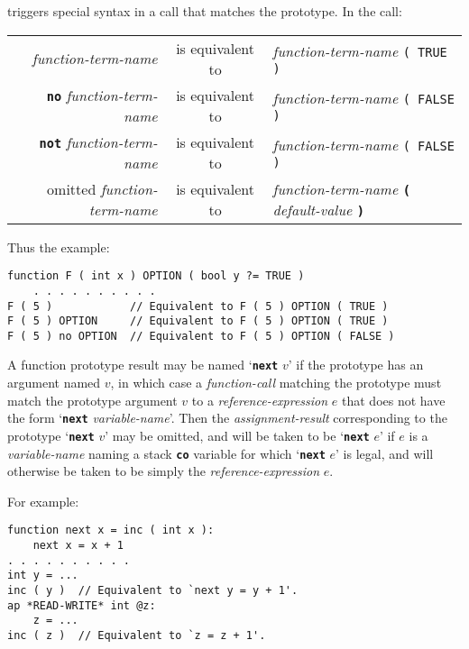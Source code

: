 \documentclass[12pt]{article}
\newcommand{\TT}[1]{{\tt \bfseries #1}}
\newenvironment{indpar}[1][0.3in]%
	{\begin{list}{}%
		     {\setlength{\itemsep}{0in}%
		      \setlength{\topsep}{0in}%
		      \setlength{\parsep}{1ex}%
		      \setlength{\labelwidth}{#1}%
		      \setlength{\leftmargin}{#1}%
		      \addtolength{\leftmargin}{\labelsep}}%
	 \item}%
	{\end{list}}
\begin{document}
triggers special syntax in a call that matches the prototype.
In the call:
\begin{center}
\begin{tabular}{rcl}
{\em function-term-name} & is equivalent to
                         & {\em function-term-name} \tt ( TRUE ) \\
\TT{no} {\em function-term-name} & is equivalent to
                         & {\em function-term-name} \tt ( FALSE ) \\
\TT{not} {\em function-term-name} & is equivalent to
                         & {\em function-term-name} \tt ( FALSE ) \\
omitted {\em function-term-name} & is equivalent to
                         & {\em function-term-name}
			   \TT{(} {\em default-value} \TT{)} \\
\end{tabular}
\end{center}
Thus the example:
\begin{indpar}\begin{verbatim}
function F ( int x ) OPTION ( bool y ?= TRUE )
    . . . . . . . . . .
F ( 5 )            // Equivalent to F ( 5 ) OPTION ( TRUE )
F ( 5 ) OPTION     // Equivalent to F ( 5 ) OPTION ( TRUE )
F ( 5 ) no OPTION  // Equivalent to F ( 5 ) OPTION ( FALSE )
\end{verbatim}\end{indpar}

A function prototype result may be named `\TT{next} $v$' if
the prototype has an argument named $v$, in which case a {\em function-call}
matching the prototype must match the prototype argument $v$ to a
{\em reference-expression} $e$ that
does not have the form `\TT{next} {\em variable-name}'.
Then the {\em assignment-result}
corresponding to the prototype `\TT{next} $v$' may be omitted, and will
be taken to be `\TT{next} $e$' if $e$ is a {\em variable-name}
naming a stack \TT{co} variable for which `\TT{next} $e$' is legal,
and will otherwise be taken to be simply the {\em reference-expression} $e$.

For example:

\begin{indpar}\begin{verbatim}
function next x = inc ( int x ):
    next x = x + 1
. . . . . . . . . .
int y = ...
inc ( y )  // Equivalent to `next y = y + 1'.
ap *READ-WRITE* int @z:
    z = ...
inc ( z )  // Equivalent to `z = z + 1'.
\end{verbatim}\end{indpar}
\end{document}
